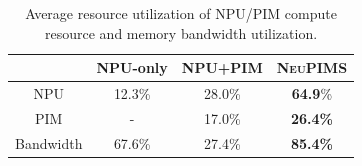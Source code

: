 \begin{table}[]
\centering
\caption{Average resource utilization of NPU/PIM compute resource and memory bandwidth utilization.}
\label{tab:util}
\small
\vspace{-2ex}
\begin{tabular}{c|c|c|c}
\hline
          & \textbf{NPU-only}          & \textbf{NPU+PIM}          & \textbf{\textsc{NeuPIMS}}         \\ \hline
NPU       & 12.3\%         & 28.0\%             & \textbf{64.9}\%   \\
PIM       & -               & 17.0\%             & \textbf{26.4\%}   \\
Bandwidth & 67.6\%         & 27.4\%             & \textbf{85.4\%}   \\
\hline
\end{tabular}
\end{table}
